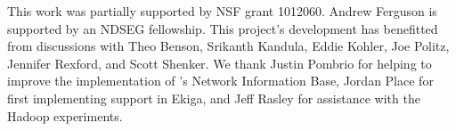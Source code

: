 
This work was partially supported by NSF grant 1012060.
Andrew Ferguson is supported by an NDSEG fellowship.
This project's development has benefitted from discussions with Theo Benson,
Srikanth Kandula, Eddie Kohler, Joe Politz, Jennifer Rexford, and Scott Shenker.
We thank Justin Pombrio for helping to improve the implementation of \sys's
Network Information Base, Jordan Place for first implementing \sys support
in Ekiga, and Jeff Rasley for assistance with the Hadoop experiments.

